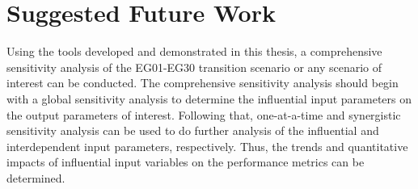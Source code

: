 \section{Suggested Future Work}
Using the tools developed and demonstrated in this thesis, a comprehensive 
sensitivity analysis of the EG01-EG30 transition scenario or any scenario of interest 
can be conducted. 
The comprehensive sensitivity analysis should begin with a global
sensitivity analysis to determine the influential input parameters 
on the output parameters of interest. 
Following that, one-at-a-time and synergistic sensitivity analysis can be used to do 
further analysis of the influential and interdependent input parameters, respectively. 
Thus, the trends and quantitative impacts of influential input variables on the performance 
metrics can be determined.  